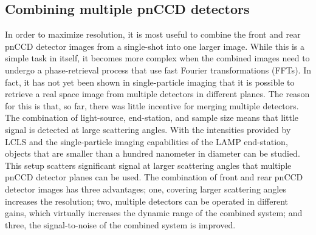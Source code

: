 \subsection{Combining multiple pnCCD detectors}\label{sec:combination-of-images}
In order to maximize resolution, it is most useful to combine the front and rear pnCCD detector images from a single-shot into one larger image. While this is a simple task in itself, it becomes more complex when the combined images need to undergo a phase-retrieval process that use fast Fourier transformations (FFTs). In fact, it has not yet been shown in single-particle imaging that it is possible to retrieve a real space image from multiple detectors in different planes.
The reason for this is that, so far, there was little incentive for merging multiple detectors. The combination of light-source, end-station, and sample size \cite{Seibert-2011-Nature} means that little signal is detected at large scattering angles. With the intensities provided by LCLS and the single-particle imaging capabilities of the LAMP end-station, objects that are smaller than a hundred nanometer in diameter can be studied. This setup scatters significant signal at larger scattering angles that multiple pnCCD detector planes can be used.
The combination of front and rear pnCCD detector images has three advantages; one, covering larger scattering angles increases the resolution; two, multiple detectors can be operated in different gains, which virtually increases the dynamic range of the combined system; and three, the signal-to-noise of the combined system is improved.\\[1\baselineskip]
